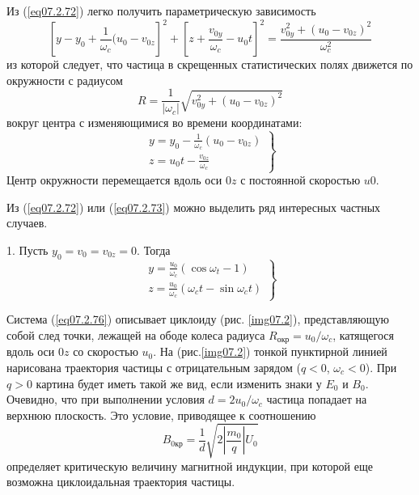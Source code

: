 Из (\ref{eq07.2.72}) легко получить параметрическую зависимость
\begin{equation}
	\left[ y - y_0 + \frac{1}{\omega_c}(u_0 - v_{0z} \right]^2 + 
		\left[ z + \frac{v_{0y}}{\omega_c} - u_0 t \right]^2 = 
		\frac{v^2_{0y} + (u_0 - v_{0z})^2}{\omega^2_c}
	\label{eq07.2.73}
\end{equation}
из которой следует, что частица в скрещенных статистических полях движется по 
окружности с радиусом
\begin{equation}
	R = \frac{1}{|\omega_c|}\sqrt{v^2_{0y}+(u_0 -v_{0z})^2}
	\label{eq07.2.74}
\end{equation}
вокруг центра с изменяющимися во времени координатами:
\begin{equation}
	\left. \begin{array}{c}
		y = y_0 - \frac{1}{\omega_c}(u_0 - v_{0z}) \\
		z = u_0 t - \frac{v_{0z}}{\omega_c}
	\end{array} \right\}
	\label{eq07.2.75}
\end{equation}
Центр окружности перемещается вдоль оси \( 0z \) с постоянной скоростью 
\( u0 \).

Из (\ref{eq07.2.72}) или (\ref{eq07.2.73}) можно выделить ряд интересных 
частных случаев. 

1. Пусть \( y_0 = v_0 = v_{0z} = 0 \). Тогда
\begin{equation}
	\left. \begin{array}{c}
		y = \frac{u_0}{\omega_c}(\cos\omega_t - 1) \\
		z = \frac{u_0}{\omega_c}(\omega_c t - \sin\omega_c t)
	\end{array} \right\}
	\label{eq07.2.76}
\end{equation}

Система (\ref{eq07.2.76})  описывает циклоиду  (рис. \ref{img07.2}), 
представляющую собой след точки, лежащей на ободе колеса радиуса 
\( R_\text{окр} = u_0 / \omega_c \), катящегося вдоль оси \( 0z \) со 
скоростью \( u_0 \). На (рис.\ref{img07.2}) тонкой пунктирной линией 
нарисована траектория частицы с отрицательным зарядом (\( q < 0 \), 
\( \omega_c < 0 \)). При \( q > 0 \) картина будет иметь такой же вид, если 
изменить знаки у \( E_0 \) и \( B_0 \). Очевидно, что при выполнении условия 
\( d = 2u_0/\omega_c \) частица попадает на верхнюю плоскость. Это условие, 
приводящее к соотношению
\[
	B_{0\text{кр}} = \frac{1}{d}\sqrt{2\left| \frac{m_0}{q} \right| U_0}
\]
определяет критическую величину магнитной индукции, при которой еще возможна 
циклоидальная траектория частицы.

